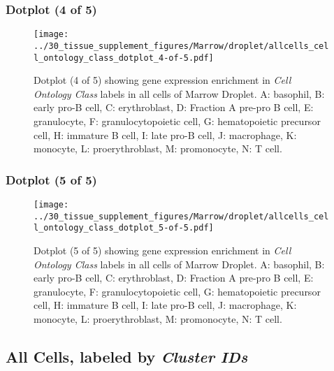 \clearpage

\subsubsection{Dotplot (4 of 5)}
\begin{figure}[h]
\centering
\texttt{[image: ../30\_tissue\_supplement\_figures/Marrow/droplet/allcells\_cell\_ontology\_class\_dotplot\_4-of-5.pdf]}

\caption{ Dotplot (4 of 5)  showing gene expression enrichment in \emph{Cell Ontology Class} labels in all cells of Marrow Droplet. A: basophil, B: early pro-B cell, C: erythroblast, D: Fraction A pre-pro B cell, E: granulocyte, F: granulocytopoietic cell, G: hematopoietic precursor cell, H: immature B cell, I: late pro-B cell, J: macrophage, K: monocyte, L: proerythroblast, M: promonocyte, N: T cell.}
\end{figure}


\clearpage

\subsubsection{Dotplot (5 of 5)}
\begin{figure}[h]
\centering
\texttt{[image: ../30\_tissue\_supplement\_figures/Marrow/droplet/allcells\_cell\_ontology\_class\_dotplot\_5-of-5.pdf]}

\caption{ Dotplot (5 of 5)  showing gene expression enrichment in \emph{Cell Ontology Class} labels in all cells of Marrow Droplet. A: basophil, B: early pro-B cell, C: erythroblast, D: Fraction A pre-pro B cell, E: granulocyte, F: granulocytopoietic cell, G: hematopoietic precursor cell, H: immature B cell, I: late pro-B cell, J: macrophage, K: monocyte, L: proerythroblast, M: promonocyte, N: T cell.}
\end{figure}


\clearpage

\subsection{All Cells, labeled by \emph{Cluster IDs}}
